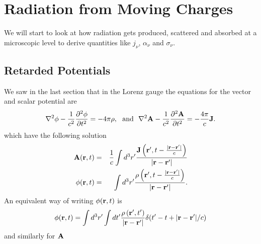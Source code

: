 \chapter{Radiation from Moving Charges}
\label{cha:radi-from-moving}
We will start to look at how radiation gets produced, scattered
and absorbed at a microscopic level to derive quantities like $j_\nu$,
$\alpha_\nu$ and $\sigma_\nu$.

\section{Retarded Potentials}
\label{sec:retarded-potentials}
We saw in the last section that in the Lorenz gauge the equations for
the vector and scalar potential are
\begin{equation}
\nabla^2 \phi - \frac{1}{c^2} \frac{\partial^2 \phi}{\partial t^2} =
-4\pi \rho,~~\hbox{\rm and}~~
  \nabla^2 {\bf A}
- \frac{1}{c^2} \frac{\partial^2 {\bf A}}{\partial t^2} =
-\frac{4\pi}{c} {\bf J}.
\label{eq:184}
\end{equation}
which have the following solution
\begin{eqnarray}
{\bf A}({\bf r},t) &=& \frac{1}{c} \int d^3 r' \frac{{\bf J}\left ({\bf
  r}',t-\frac{|{\bf r}-{\bf r}'|}{c} \right )}{|{\bf r} -
{\bf  r}'|} \\
\phi({\bf r},t) &=& \int d^3 r' \frac{\rho\left ({\bf
  r}',t-\frac{|{\bf r}-{\bf r}'|}{c} \right )}{|{\bf r} -
{\bf  r}'|} .
\label{eq:185}
\end{eqnarray}
An equivalent way of writing $\phi({\bf r},t)$ is
\begin{equation}
\phi({\bf r},t) = \int d^3 r' \int dt' \frac{\rho \left ({\bf
  r}',t'\right )}{|{\bf r} -
{\bf  r}'|} \delta ( t' - t + |{\bf r}-{\bf r}'|/c ) 
\label{eq:186}
\end{equation}
and similarly for ${\bf A}$

